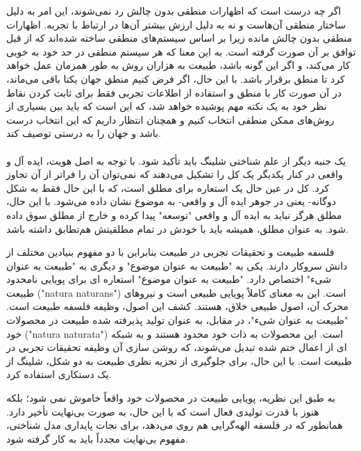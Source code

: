 \documentclass[10pt,a4paper]{article}
\begin{document}
اگر چه درست است که اظهارات منطقی بدون چالش رد نمی‌شوند، این امر به دلیل ساختار منطقی آن‌هاست و نه به دلیل ارزش بیشتر آن‌ها در ارتباط با تجربه. اظهارات منطقی بدون چالش مانده زیرا بر اساس سیستم‌های منطقی ساخته شده‌اند که از قبل توافق بر آن صورت گرفته است. به این معنا که هر سیستم منطقی در حد خود به خوبی کار می‌کند، و اگر این گونه باشد، طبیعت به هزاران روش به طور همزمان عمل خواهد کرد تا منطق برقرار باشد. با این حال، اگر فرض کنیم منطق جهان یکتا باقی می‌ماند، در آن صورت کار با منطق و استفاده از اطلاعات تجربی فقط برای ثابت کردن نقاط نظر خود به یک نکته مهم پوشیده خواهد شد، که این است که باید بین بسیاری از روش‌های ممکن منطقی انتخاب کنیم و همچنان انتظار داریم که این انتخاب درست باشد و جهان را به درستی توصیف کند.
                \\
                \\
                یک جنبه دیگر از علم شناختی شلینگ باید تأکید شود. با توجه به اصل هویت، ایده آل و واقعی در کنار یکدیگر یک کل را تشکیل می‌دهند که نمی‌توان آن را فراتر از آن تجاوز کرد. کل در عین حال یک استعاره برای مطلق است، که با این حال فقط به شکل دوگانه- یعنی در جوهر ایده آل و واقعی- به موضوع نشان داده می‌شود. با این حال، مطلق هرگز نباید به ایده آل و واقعی "توسعه" پیدا کرده و خارج از مطلق سوق داده شود. به عنوان مطلق، همیشه باید با خودش در تمام مطلقیتش هم‌تطابق داشته باشد.
                \begin{qt}
                   فلسفه طبیعت و تحقیقات تجربی در طبیعت بنابراین با دو مفهوم بنیادین مختلف از دانش سروکار دارند. یکی به "طبیعت به عنوان موضوع" و دیگری به "طبیعت به عنوان شیء" اختصاص دارد. "طبیعت به عنوان موضوع" استعاره ای برای پویایی نامحدود طبیعت ("natura naturans") است. این به معنای کاملاً پویایی طبیعی است و نیروهای محرک آن، اصول طبیعی خلاق، هستند. کشف این اصول، وظیفه فلسفه طبیعت است. "طبیعت به عنوان شیء"، در مقابل، به عنوان تولید پذیرفته شده طبیعت در محصولات خود ("natura naturata") است. این محصولات به ذات خود محدود هستند و به شبکه ای از اعمال ختم شده تبدیل می‌شوند، که روشن سازی آن وظیفه تحقیقات تجربی در طبیعت است. با این حال، برای جلوگیری از تجزیه نظری طبیعت به دو شکل، شلینگ از یک دستکاری استفاده کرد.
                \end{qt}
               به طبق این نظریه، پویایی طبیعت در محصولات خود واقعاً خاموش نمی شود؛ بلکه هنوز با قدرت تولیدی فعال است که با این حال، به صورت بی‌نهایت تأخیر دارد. همانطور که در فلسفه الهه‌گرایی هم روی می‌دهد، برای نجات پایداری مدل شناختی، مفهوم بی‌نهایت مجدداً باید به کار گرفته شود.\cite{Kuppers2018-vv}
    
\end{document}
